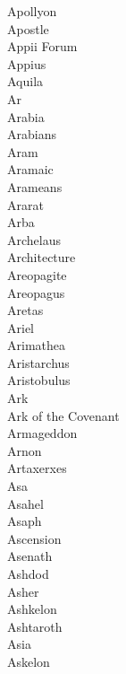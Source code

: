 Apollyon  \\
Apostle  \\
Appii Forum  \\
Appius  \\
Aquila  \\
Ar  \\
Arabia  \\
Arabians  \\
Aram  \\
Aramaic  \\
Arameans  \\
Ararat  \\
Arba  \\
Archelaus  \\
Architecture  \\
Areopagite  \\
Areopagus  \\
Aretas  \\
Ariel  \\
Arimathea  \\
Aristarchus  \\
Aristobulus  \\
Ark  \\
Ark of the Covenant  \\
Armageddon  \\
Arnon  \\
Artaxerxes  \\
Asa  \\
Asahel  \\
Asaph  \\
Ascension  \\
Asenath  \\
Ashdod  \\
Asher  \\
Ashkelon  \\
Ashtaroth  \\
Asia  \\
Askelon  \\
